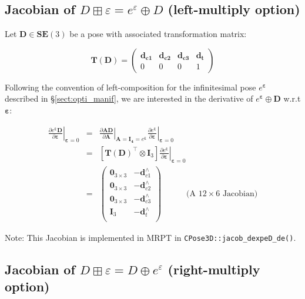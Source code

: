 \documentclass[a4paper,11pt]{report}
\newcommand{\E}{{\bm{\varepsilon}}}
\newcommand{\hatop}[1]{#1^\wedge}
\begin{document}
\subsection{Jacobian of $D\boxplus \varepsilon = e^\varepsilon \oplus D$ (left-multiply option)}
\label{sect:jacob_eD}

Let $\mathbf{D} \in \mathbf{SE}(3)$ be a pose with associated transformation matrix:

\begin{equation}
\mathbf{T}(\mathbf{D}) =
\left(
\begin{array}{ccc|c}
 \mathbf{d_{c1}}  & \mathbf{d_{c2}}  & \mathbf{d_{c3}}  & \mathbf{d_{t}}  \\
\hline
  0 & 0 & 0 & 1
\end{array}
\right)
\end{equation}

Following the convention of left-composition for the infinitesimal
pose $e^\E$ described in \S\ref{sect:opti_manif},
we are interested in the derivative of $e^\E \oplus \mathbf{D}$ w.r.t $\E$:

\begin{eqnarray}
\left. \frac{\partial e^\E \mathbf{D}}{\partial \E} \right|_{\E = 0}
&=&
\left. \frac{\partial \mathbf{A} \mathbf{D}}{\partial \mathbf{A} } \right|_{\mathbf{A}=\mathbf{I_4} = e^\E}
\left. \frac{\partial e^\E}{\partial \E} \right|_{\E=0}
\\
&=&
\left[ \mathbf{T}(\mathbf{D})^\top \otimes  \mathbf{I}_3 \right]
\left. \frac{\partial e^\E}{\partial \E} \right|_{\E=0}
\\
&=&
\left(
\begin{array}{cc}
 \mathbf{0}_{3\times 3}  & -\hatop{\mathbf{d}}_{c1} \\
 \mathbf{0}_{3\times 3}  & -\hatop{\mathbf{d}}_{c2} \\
 \mathbf{0}_{3\times 3}  & -\hatop{\mathbf{d}}_{c3} \\
 \mathbf{I}_{3}  & -\hatop{\mathbf{d}}_{t} \\
\end{array}
\right)
\quad\quad\quad \text{(A $12 \times 6$ Jacobian)}
\end{eqnarray}

Note: This Jacobian is implemented in MRPT in \texttt{CPose3D::jacob\_dexpeD\_de()}.


\subsection{Jacobian of $D\boxplus \varepsilon = D \oplus e^\varepsilon$  (right-multiply option)}
\label{sect:jacob_De}
\end{document}
